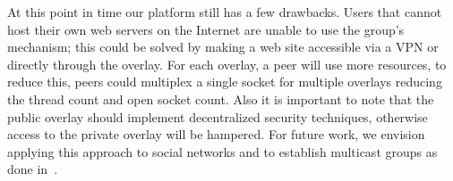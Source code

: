 \documentclass[conference]{IEEEtran}
\begin{document}
At this point in time our platform still has a few drawbacks.  Users that
cannot host their own web servers on the Internet are unable to use the group's
mechanism; this could be solved by making a web site accessible via a VPN or
directly through the overlay.  For each overlay, a peer will use more
resources, to reduce this, peers could multiplex a single socket for multiple
overlays reducing the thread count and open socket count.  Also it is important
to note that the public overlay should implement decentralized security
techniques, otherwise access to the private overlay will be hampered.  For
future work, we envision applying this approach to social networks and to
establish multicast groups as done in~\cite{can}.



\suppressfloats
\end{document}
